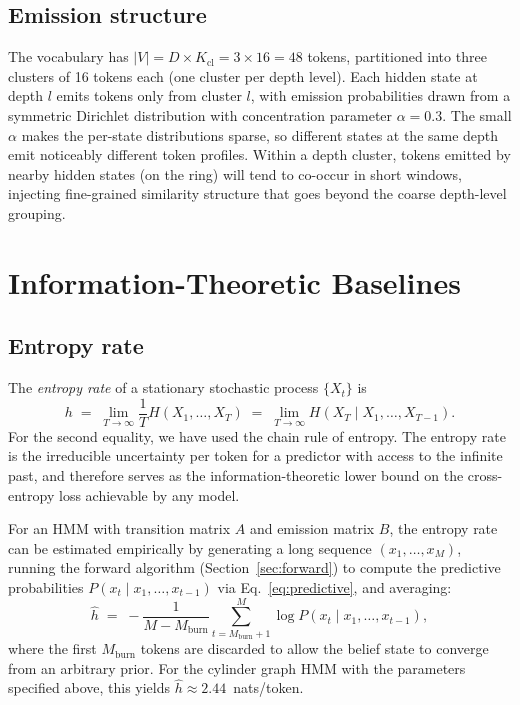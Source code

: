 \documentclass[11pt]{article}
\begin{document}
\subsection{Emission structure}

The vocabulary has $|V| = D \times K_{\mathrm{cl}} = 3 \times 16 = 48$ tokens, partitioned into three clusters of 16 tokens each (one cluster per depth level).  Each hidden state at depth $l$ emits tokens only from cluster $l$, with emission probabilities drawn from a symmetric Dirichlet distribution with concentration parameter $\alpha = 0.3$.  The small $\alpha$ makes the per-state distributions sparse, so different states at the same depth emit noticeably different token profiles.  Within a depth cluster, tokens emitted by nearby hidden states (on the ring) will tend to co-occur in short windows, injecting fine-grained similarity structure that goes beyond the coarse depth-level grouping.

\section{Information-Theoretic Baselines}\label{sec:baselines}

\subsection{Entropy rate}\label{sec:entropy-rate}

The \emph{entropy rate} of a stationary stochastic process $\{X_t\}$ is
\begin{equation}
  h \;=\; \lim_{T \to \infty} \frac{1}{T} H(X_1, \dots, X_T)
    \;=\; \lim_{T \to \infty} H(X_T \mid X_1, \dots, X_{T-1}).
\end{equation}
For the second equality, we have used the chain rule of entropy.  The entropy rate is the irreducible uncertainty per token for a predictor with access to the infinite past, and therefore serves as the information-theoretic lower bound on the cross-entropy loss achievable by any model.

For an HMM with transition matrix $A$ and emission matrix $B$, the entropy rate can be estimated empirically by generating a long sequence $(x_1, \dots, x_M)$, running the forward algorithm (Section~\ref{sec:forward}) to compute the predictive probabilities $P(x_t \mid x_1, \dots, x_{t-1})$ via Eq.~\eqref{eq:predictive}, and averaging:
\begin{equation}
  \hat{h} \;=\; -\frac{1}{M - M_{\mathrm{burn}}}
    \sum_{t=M_{\mathrm{burn}}+1}^{M} \log P(x_t \mid x_1, \dots, x_{t-1}),
\end{equation}
where the first $M_{\mathrm{burn}}$ tokens are discarded to allow the belief state to converge from an arbitrary prior.  For the cylinder graph HMM with the parameters specified above, this yields $\hat{h} \approx 2.44$~nats/token.
\end{document}
